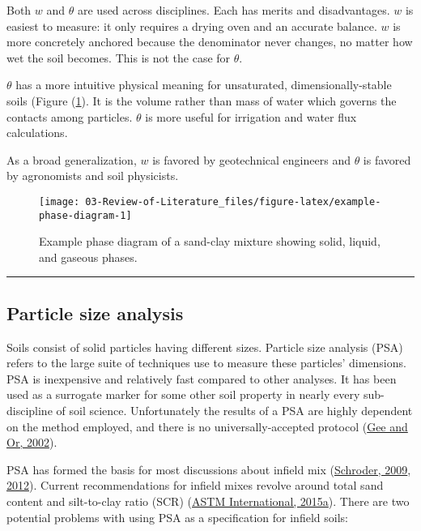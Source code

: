 \documentclass[
  letterpaper,
  openany]{book}
\begin{document}
Both \(w\) and \(\theta\) are used across disciplines.
Each has merits and disadvantages.
\(w\) is easiest to measure: it only requires a drying oven and an accurate balance.
\(w\) is more concretely anchored because the denominator never changes, no matter how wet the soil becomes.
This is not the case for \(\theta\).

\(\theta\) has a more intuitive physical meaning for unsaturated, dimensionally-stable soils (Figure (\ref{fig:example-phase-diagram}).
It is the volume rather than mass of water which governs the contacts among particles.
\(\theta\) is more useful for irrigation and water flux calculations.

As a broad generalization, \(w\) is favored by geotechnical engineers and \(\theta\) is favored by agronomists and soil physicists.

\begin{figure}[htbp]

{\centering \texttt{[image: 03-Review-of-Literature\_files/figure-latex/example-phase-diagram-1]} 

}

\caption[Example phase diagram for an unsaturated sand-clay mix.]{Example phase diagram of a sand-clay mixture showing solid, liquid, and gaseous phases.}\label{fig:example-phase-diagram}
\end{figure}

\begin{center}\rule{0.5\linewidth}{0.5pt}\end{center}

\newpage

\hypertarget{particle-size-analysis}{%
\subsection{Particle size analysis}\label{particle-size-analysis}}

Soils consist of solid particles having different sizes.
Particle size analysis (PSA) refers to the large suite of techniques use to measure these particles' dimensions.
PSA is inexpensive and relatively fast compared to other analyses.
It has been used as a surrogate marker for some other soil property in nearly every sub-discipline of soil science.
Unfortunately the results of a PSA are highly dependent on the method employed, and there is no universally-accepted protocol (\protect\hyperlink{ref-Gee2002}{Gee and Or, 2002}).

PSA has formed the basis for most discussions about infield mix (\protect\hyperlink{ref-Schroder2009}{Schroder, 2009}, \protect\hyperlink{ref-Schroder2012}{2012}).
Current recommendations for infield mixes revolve around total sand content and silt-to-clay ratio (SCR) (\protect\hyperlink{ref-ASTMF2107-08}{ASTM International, 2015a}).
There are two potential problems with using PSA as a specification for infield soils:
\end{document}
